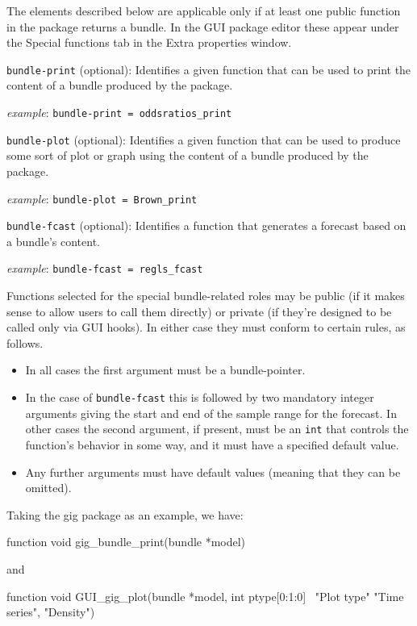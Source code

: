 \documentclass[oneside]{book}
\newcommand{\vbusage}[0]{\textit{example}: \quad}
\begin{document}
The elements described below are applicable only if at least one
public function in the package returns a bundle. In the GUI package
editor these appear under the \textsf{Special functions} tab in the
\textsf{Extra properties} window.

\begin{description}

\item \texttt{bundle-print} (optional): Identifies a given function that can
  be used to print the content of a bundle produced by the package.

  \vbusage{} \verb|bundle-print = oddsratios_print|

\item \texttt{bundle-plot} (optional): Identifies a given function that can
  be used to produce some sort of plot or graph using the content of a
  bundle produced by the package.

  \vbusage{} \verb|bundle-plot = Brown_print|

\item \texttt{bundle-fcast} (optional): Identifies a function that
  generates a forecast based on a bundle's content.

  \vbusage{} \verb|bundle-fcast = regls_fcast|

\end{description}

Functions selected for the special bundle-related roles may be public (if it
makes sense to allow users to call them directly) or private (if they're
designed to be called only via GUI hooks). In either case they must conform
to certain rules, as follows.
\begin{itemize}
\item In all cases the first argument must be a bundle-pointer.
\item In the case of \texttt{bundle-fcast} this is followed by two
  mandatory integer arguments giving the start and end of the sample
  range for the forecast. In other cases the second argument, if
  present, must be an \texttt{int} that controls the function's
  behavior in some way, and it must have a specified default value.
\item Any further arguments must have default values (meaning that
  they can be omitted).
\end{itemize}

Taking the \textsf{gig} package as an example, we have:
%
\begin{code}
  function void gig_bundle_print(bundle *model)
\end{code}
%
and
%
\begin{code}
  function void GUI_gig_plot(bundle *model, int ptype[0:1:0] \
                             "Plot type" {"Time series", "Density"})
\end{code}
\end{document}
